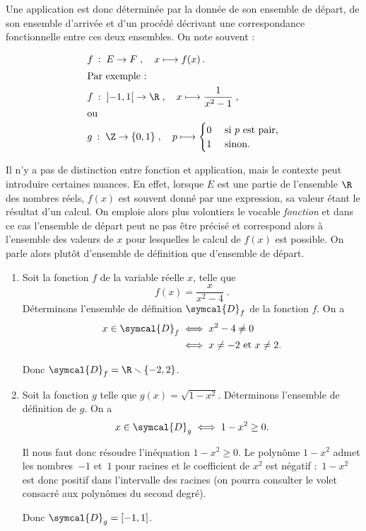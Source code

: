 Une application est donc déterminée par la donnée de son ensemble de départ, de son ensemble d'arrivée et d'un procédé décrivant une correspondance fonctionnelle entre ces deux ensembles. On note souvent :

\begin{align*}&f\::\;E\to F\;,\quad x\longmapsto f(x)\,.\\
\intertext{Par exemple :}
&f\::\;\left]-1,1\right[\to\R\;,\quad x \longmapsto \frac{1}{x^2-1}\;,\\
\intertext{ou}
&g\::\;\Z\to\{0,1\}\;,\quad p\longmapsto
\begin{cases} 0&\text{ si $p$ est pair,}\\
1&\text{ sinon.}
\end{cases}
\end{align*}

Il n'y a pas de distinction entre fonction et application, mais le contexte peut introduire certaines nuances. En effet, lorsque $E$ est une partie de l'ensemble $\R$ des nombres réels, $f(x)$ est souvent donné par une expression, sa valeur étant le résultat d'un calcul. On emploie alors plus volontiers le vocable \emph{fonction} et dans ce cas l'ensemble de départ peut ne pas être précisé et correspond alors à l'ensemble des valeurs de $x$ pour lesquelles le calcul de $f(x)$ est possible. On parle alors plutôt d'ensemble de définition que d'ensemble de départ. 

\begin{example}[Exemples]
\begin{enumerate}
\item Soit la fonction $f$ de la variable réelle $x$, telle que 
\[f(x)=\frac{x}{x^2-4}\;.
\]
Déterminons l'ensemble de définition $\symcal{D}_f$ de la fonction $f$. On a 
\begin{align*}
x\in \symcal{D}_f &\iff x^2-4\neq 0\\
&\iff x\neq -2 \text{ et } x\neq 2.
\end{align*}

Donc $\symcal{D}_f= \R\smallsetminus\{-2,2\}$.
\item Soit la fonction $g$ telle que $g(x)=\sqrt{1-x^2}$. Déterminons l'ensemble de définition de $g$. On a
\[
x\in \symcal{D}_g \iff 1-x^2\geq 0.
\]

Il nous faut donc résoudre l'inéquation $1-x^2\geq0$. Le polynôme $1-x^2$ admet les nombres~$-1$ et~$1$ pour racines et le coefficient de $x^2$ est négatif :~\mbox{$1-x^2$} est donc positif dans l'intervalle des racines (on  pourra consulter le volet consacré aux polynômes du second degré).

Donc $\symcal{D}_g= \left[-1,1\right]$.
\end{enumerate}
\end{example}

